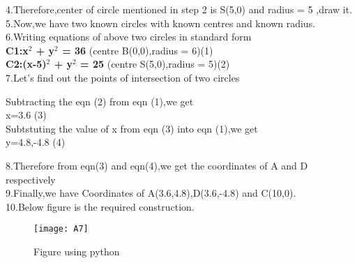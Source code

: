 \documentclass[a4paper,12pt]{article}
\begin{document}
4.Therefore,center of circle mentioned in step 2 is S(5,0) and radius = 5 ,draw it.\\

5.Now,we have two known circles with known centres and known radius.\\

6.Writing equations of above two circles in standard form\\

\textbf{C1:x$^2$ + y$^2$ = 36 }   \hspace*{3cm}(centre B(0,0),radius = 6)\hspace*{1cm}(1)\\

\textbf{C2:(x-5)$^2$ + y$^2$ = 25}  \hspace*{2.5cm}(centre S(5,0),radius = 5)\hspace*{1cm}(2)\\

7.Let's find out the points of intersection of two circles\\
 
 \begin{center}
 Subtracting the eqn (2) from eqn (1),we get\\
  x=3.6 \hspace*{10.5cm}(3)\\
 Subtstuting the value of x from eqn (3) into eqn (1),we get\\
  y=4.8,-4.8 \hspace*{10cm}(4)\\        
 \end{center}

8.Therefore from eqn(3) and eqn(4),we get the coordinates of A and D   \hspace*{1cm} respectively\\

9.Finally,we have Coordinates of A(3.6,4.8),D(3.6,-4.8) and C(10,0).\\

10.Below figure is the required construction.
\begin{figure}[h]
\centering
\texttt{[image: A7]}
\caption{Figure using python}
\end{figure}
\end{document}
